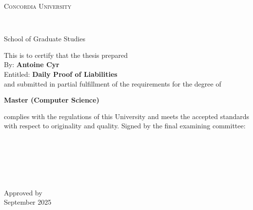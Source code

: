 
\thispagestyle{empty} %

\begin{center}\begin{Large} \textsc{Concordia University} \end{Large} \\
\begin{large} School of Graduate Studies \end{large} \end{center}
\vfill
This is to certify that the thesis prepared\\
By: \tab   \textbf{Antoine Cyr } \\
Entitled: \tab \textbf{Daily Proof of Liabilities}\\
 and submitted in partial fulfillment of the requirements for the degree of
\begin{center}
\textbf{Master (Computer Science)}
\end{center}
complies with the regulations of this University and meets the
accepted standards with respect to originality and quality.
\vfill
\noindent Signed by the final examining committee: \\[1.3em]
\hspace*{1cm} \raisebox{-0.9em}{\rlap{\it \small }}\hrulefill {} \\[1.3em]
\hspace*{1cm} \raisebox{-0.9em}{\rlap{\it \small }}\hrulefill {} \\[1.3em]
\hspace*{1cm} \raisebox{-0.9em}{\rlap{\it \small }}\hrulefill {} \\[1.3em]
\hspace*{1cm} \raisebox{-0.9em}{\rlap{\it \small }}\hrulefill {} \\[1.3em]
\hspace*{1cm} \raisebox{-0.9em}{\rlap{\it \small }}\hrulefill {} \\[1.3em]
\hspace*{1cm} \raisebox{-0.9em}{\rlap{\it \small }}\hrulefill {} \\[1.3em]
\vfill
\noindent Approved by \raisebox{-0.9em}{\rlap{\it }}\hrulefill \\[1.3em]
 September 2025 \raisebox{-0.9em}{\rlap{\it }}\hrulefill \\





